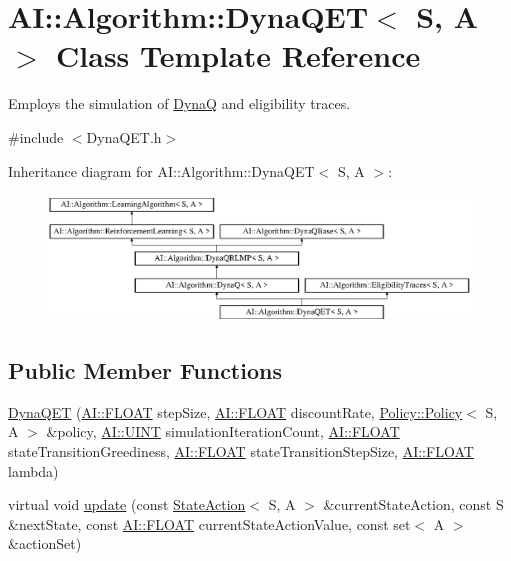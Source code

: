 \hypertarget{classAI_1_1Algorithm_1_1DynaQET}{\section{A\+I\+:\+:Algorithm\+:\+:Dyna\+Q\+E\+T$<$ S, A $>$ Class Template Reference}
\label{classAI_1_1Algorithm_1_1DynaQET}
}


Employs the simulation of \hyperlink{classAI_1_1Algorithm_1_1DynaQ}{Dyna\+Q} and eligibility traces.  




{\ttfamily \#include $<$Dyna\+Q\+E\+T.\+h$>$}

Inheritance diagram for A\+I\+:\+:Algorithm\+:\+:Dyna\+Q\+E\+T$<$ S, A $>$\+:\begin{figure}[H]
\begin{center}
\leavevmode
\includegraphics[height=3.357314cm]{classAI_1_1Algorithm_1_1DynaQET}
\end{center}
\end{figure}
\subsection*{Public Member Functions}
\begin{DoxyCompactItemize}
\item 
\hyperlink{classAI_1_1Algorithm_1_1DynaQET_a019b0f19851056777310084939f0b3a1}{Dyna\+Q\+E\+T} (\hyperlink{namespaceAI_a41b74884a20833db653dded3918e05c3}{A\+I\+::\+F\+L\+O\+A\+T} step\+Size, \hyperlink{namespaceAI_a41b74884a20833db653dded3918e05c3}{A\+I\+::\+F\+L\+O\+A\+T} discount\+Rate, \hyperlink{classAI_1_1Algorithm_1_1Policy_1_1Policy}{Policy\+::\+Policy}$<$ S, A $>$ \&policy, \hyperlink{namespaceAI_ab6e14dc1e659854858a87e511f1439ec}{A\+I\+::\+U\+I\+N\+T} simulation\+Iteration\+Count, \hyperlink{namespaceAI_a41b74884a20833db653dded3918e05c3}{A\+I\+::\+F\+L\+O\+A\+T} state\+Transition\+Greediness, \hyperlink{namespaceAI_a41b74884a20833db653dded3918e05c3}{A\+I\+::\+F\+L\+O\+A\+T} state\+Transition\+Step\+Size, \hyperlink{namespaceAI_a41b74884a20833db653dded3918e05c3}{A\+I\+::\+F\+L\+O\+A\+T} lambda)
\item 
virtual void \hyperlink{classAI_1_1Algorithm_1_1DynaQET_a53b0e06842fbb802acfa5384a84ad448}{update} (const \hyperlink{classAI_1_1StateAction}{State\+Action}$<$ S, A $>$ \&current\+State\+Action, const S \&next\+State, const \hyperlink{namespaceAI_a41b74884a20833db653dded3918e05c3}{A\+I\+::\+F\+L\+O\+A\+T} current\+State\+Action\+Value, const set$<$ A $>$ \&action\+Set)
\end{DoxyCompactItemize}
